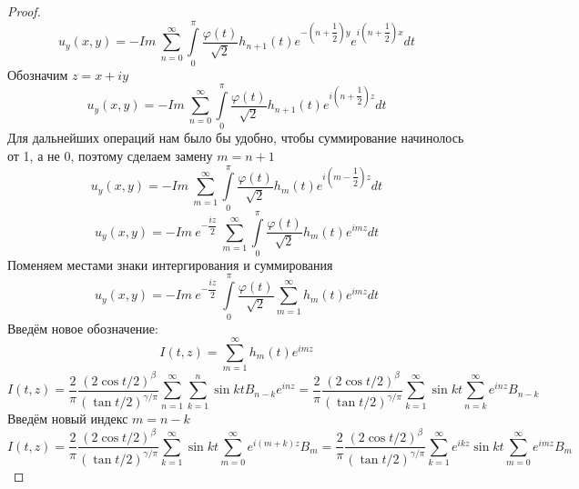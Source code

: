 \documentclass[a4paper, 9pt]{article}
\begin{document}
\begin{proof}
		\begin{equation*}
			u_y(x,y)  = -  Im \ \sum\limits_{n=0}^{\infty}  \int\limits_0^\pi \dfrac{\varphi(t)}{\sqrt2}  h_{n+1}(t)  e^{-\left(n + \dfrac12\right)y} e^{i\left(n + \dfrac12\right)x} dt
		\end{equation*}
		Обозначим $z = x + iy$
		\begin{equation*}
			u_y(x,y)  = -  Im \ \sum\limits_{n=0}^{\infty}  \int\limits_0^\pi \dfrac{\varphi(t)}{\sqrt2}  h_{n+1}(t)  e^{i\left(n+\dfrac12\right) z}  dt
		\end{equation*}
		Для дальнейших операций нам было бы удобно, чтобы суммирование начинолось от 1, а не 0, поэтому сделаем замену $m = n +1$
		\begin{equation*}
			u_y(x,y)  = -  Im \ \sum\limits_{m=1}^{\infty}  \int\limits_0^\pi \dfrac{\varphi(t)}{\sqrt2}  h_{m}(t)  e^{i\left(m-\dfrac12\right) z}  dt
		\end{equation*}
		\begin{equation*}
			u_y(x,y)  = -  Im \ e^{-\dfrac{iz}{2}}\ \sum\limits_{m=1}^{\infty}  \int\limits_0^\pi \dfrac{\varphi(t)}{\sqrt2}  h_{m}(t)  e^{im z}  dt
		\end{equation*}
		Поменяем местами знаки интергирования и суммирования
		\begin{equation*}
			u_y(x,y)  = -  Im \ e^{-\dfrac{iz}{2}}\  \int\limits_0^\pi \dfrac{\varphi(t)}{\sqrt2}  \sum\limits_{m=1}^{\infty}   h_{m}(t)  e^{im z}  dt
		\end{equation*}
		Введём новое обозначение:
		\begin{equation*}
			I(t,z) = \sum\limits_{m=1}^{\infty}  h_{m}(t)  e^{im z}
		\end{equation*}
		\begin{equation*}
			I(t,z) =\dfrac{2}{\pi}\dfrac{(2\cos{t/2})^\beta}{(\tan{t/2})^{\gamma/\pi}} \sum\limits_{n=1}^{\infty}   \sum\limits_{k=1}^n \sin{kt} B_{n-k} e^{inz} = 
			\dfrac{2}{\pi}\dfrac{(2\cos{t/2})^\beta}{(\tan{t/2})^{\gamma/\pi}} \sum\limits_{k=1}^{\infty} \sin{kt} \sum\limits_{n=k}^{\infty} e^{inz} B_{n-k}
		\end{equation*}
		Введём новый индекс $m = n - k$
		\begin{equation*}
			I(t,z) = \dfrac{2}{\pi}\dfrac{(2\cos{t/2})^\beta}{(\tan{t/2})^{\gamma/\pi}} \sum\limits_{k=1}^{\infty} \sin{kt} \sum\limits_{m =0 }^{\infty} e^{i(m+k)z} B_{m} = 
			\dfrac{2}{\pi}\dfrac{(2\cos{t/2})^\beta}{(\tan{t/2})^{\gamma/\pi}} \sum\limits_{k=1}^{\infty} e^{ikz}\sin{kt} \sum\limits_{m =0 }^{\infty} e^{imz} B_{m}
		\end{equation*}

\end{proof}
\end{document}
